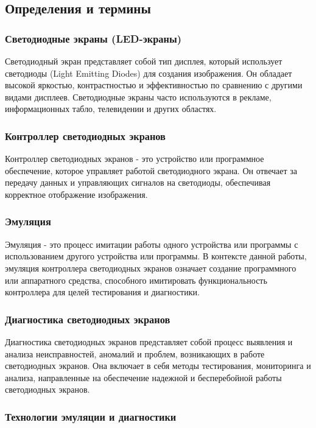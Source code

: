 \subsection{Определения и термины}

\subsubsection{Светодиодные экраны (LED-экраны)}

Светодиодный экран представляет собой тип дисплея, который использует светодиоды (Light Emitting Diodes) для создания изображения. Он обладает высокой яркостью, контрастностью и эффективностью по сравнению с другими видами дисплеев. Светодиодные экраны часто используются в рекламе, информационных табло, телевидении и других областях.

\subsubsection{Контроллер светодиодных экранов}

Контроллер светодиодных экранов - это устройство или программное обеспечение, которое управляет работой светодиодного экрана. Он отвечает за передачу данных и управляющих сигналов на светодиоды, обеспечивая корректное отображение изображения.

\subsubsection{Эмуляция}

Эмуляция - это процесс имитации работы одного устройства или программы с использованием другого устройства или программы. В контексте данной работы, эмуляция контроллера светодиодных экранов означает создание программного или аппаратного средства, способного имитировать функциональность контроллера для целей тестирования и диагностики.

\subsubsection{Диагностика светодиодных экранов}

Диагностика светодиодных экранов представляет собой процесс выявления и анализа неисправностей, аномалий и проблем, возникающих в работе светодиодных экранов. Она включает в себя методы тестирования, мониторинга и анализа, направленные на обеспечение надежной и бесперебойной работы светодиодных экранов.


\subsubsection{Технологии эмуляции и диагностики}

